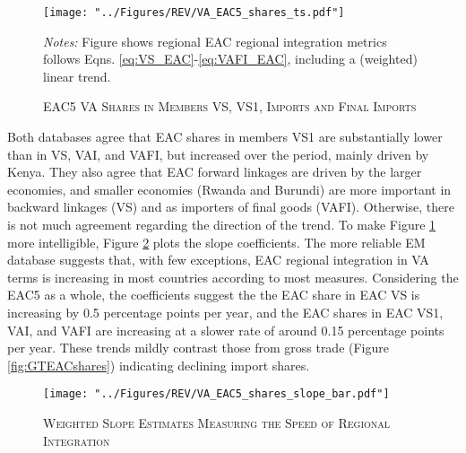 \documentclass[a4paper]{article}
\begin{document}
%
%
\begin{figure}[h!] \vspace{-3mm}
\centering
\caption{\label{fig:VAEACshares}\textsc{EAC5 VA Shares in Members VS, VS1, Imports and Final Imports}}
\texttt{[image: "../Figures/REV/VA\_EAC5\_shares\_ts.pdf"]} \\ %
\raggedright
\scriptsize
\emph{Notes:} Figure shows regional EAC regional integration metrics follows Eqns. \ref{eq:VS_EAC}-\ref{eq:VAFI_EAC}, including a (weighted) linear trend. 
\end{figure}
\FloatBarrier
%
Both databases agree that EAC shares in members VS1 are substantially lower than in VS, VAI, and VAFI, but increased over the period, mainly driven by Kenya. They also agree that EAC forward linkages are driven by the larger economies, and smaller economies (Rwanda and Burundi) are more important in backward linkages (VS) and as importers of final goods (VAFI). Otherwise, there is not much agreement regarding the direction of the trend. To make Figure \ref{fig:VAEACshares} more intelligible, Figure \ref{fig:VAEACshares_bar} plots the slope coefficients. %
The more reliable EM database suggests that, with few exceptions, EAC regional integration in VA terms is increasing in most countries according to most measures. Considering the EAC5 as a whole, the coefficients suggest the the EAC share in EAC VS is increasing by 0.5 percentage points per year, and the EAC shares in EAC VS1, VAI, and VAFI are increasing at a slower rate of around 0.15 percentage points per year. These trends mildly contrast those from gross trade (Figure \ref{fig:GTEACshares}) indicating declining import shares. 
%
\begin{figure}[h!] \vspace{-3mm}
\centering
\caption{\label{fig:VAEACshares_bar}\textsc{Weighted Slope Estimates Measuring the Speed of Regional Integration}}
\texttt{[image: "../Figures/REV/VA\_EAC5\_shares\_slope\_bar.pdf"]} %
 \vspace{-8mm}
\end{figure}
\end{document}
